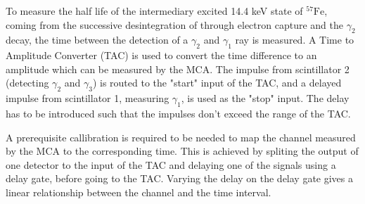 To measure the half life of the intermediary excited 14.4 keV state of \(^{57}\textrm{Fe}\), coming from the successive desintegration of \cobalt through electron capture and the \(\gamma_2\) decay, the time between the detection of a \(\gamma_2\) and \(\gamma_1\) ray is measured. A Time to Amplitude Converter (TAC) is used to convert the time difference to an amplitude which can be measured by the MCA. The impulse from scintillator 2 (detecting \(\gamma_2\) and \(\gamma_3\)) is routed to the "start" input of the TAC, and a delayed impulse from scintillator 1, measuring \(\gamma_1\), is used as the "stop" input. The delay has to be introduced such that the impulses don't exceed the range of the TAC.

A prerequisite callibration is required to be needed to map the channel measured by the MCA to the corresponding time. This is achieved by spliting the output of one detector to the input of the TAC and delaying one of the signals using a delay gate, before going to the TAC. Varying the delay on the delay gate gives a linear relationship between the channel and the time interval.
